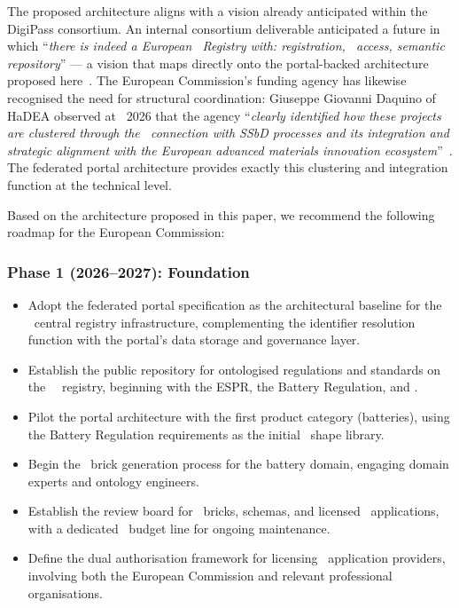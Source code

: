 The proposed architecture aligns with a vision already anticipated within the
DigiPass consortium. An internal consortium deliverable anticipated a future in
which ``\textit{there is indeed a European \DPP\ Registry with: registration,
\API\ access, semantic repository}'' --- a vision that maps directly onto the
portal-backed architecture proposed here~\cite{dpp4eu2026_postconf}. The
European Commission's funding agency has likewise recognised the need for
structural coordination: Giuseppe Giovanni Daquino of HaDEA observed at
\DPPforEU~2026 that the agency ``\textit{clearly identified how these projects
are clustered through the \DPP\ connection with SSbD processes and its
integration and strategic alignment with the European advanced materials
innovation ecosystem}''~\cite{dpp4eu2026_postconf}. The federated portal
architecture provides exactly this clustering and integration function at the
technical level.

Based on the architecture proposed in this paper, we recommend the following
roadmap for the European Commission:

\subsubsection{Phase 1 (2026--2027): Foundation}

\begin{itemize}
\item Adopt the federated portal specification as the architectural baseline for
the \DPP\ central registry infrastructure, complementing the identifier
resolution function with the portal's data storage and governance layer.
\item Establish the public repository for ontologised regulations and standards
on the \EC\ \DPP\ registry, beginning with the ESPR, the Battery Regulation, and
\REACH.
\item Pilot the portal architecture with the first product category (batteries),
using the Battery Regulation requirements as the initial \SHACL\ shape library.
\item Begin the \SHACL\ brick generation process for the battery domain,
engaging domain experts and ontology engineers.
\item Establish the review board for \SHACL\ bricks, schemas, and licensed \DPP\
applications, with a dedicated \EU\ budget line for ongoing maintenance.
\item Define the dual authorisation framework for licensing \DPP\ application
providers, involving both the European Commission and relevant professional
organisations.
\end{itemize}

